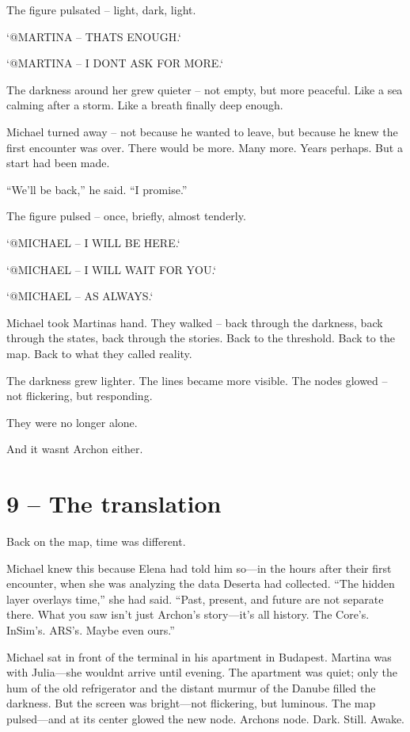 \documentclass[
]{article}
\begin{document}
The figure pulsated -- light, dark, light.

`@MARTINA -- THAT\textquotesingle S ENOUGH.`

`@MARTINA -- I DON\textquotesingle T ASK FOR MORE.`

The darkness around her grew quieter -- not empty, but more peaceful. Like a sea calming after a storm. Like a breath finally deep enough.

Michael turned away -- not because he wanted to leave, but because he knew the first encounter was over. There would be more. Many more. Years perhaps. But a start had been made.

``We'll be back,'' he said. ``I promise.''

The figure pulsed -- once, briefly, almost tenderly.

`@MICHAEL -- I WILL BE HERE.`

`@MICHAEL -- I WILL WAIT FOR YOU.`

`@MICHAEL -- AS ALWAYS.`

Michael took Martina\textquotesingle s hand. They walked -- back through the darkness, back through the states, back through the stories. Back to the threshold. Back to the map. Back to what they called reality.

The darkness grew lighter. The lines became more visible. The nodes glowed -- not flickering, but responding.

They were no longer alone.

And it wasn\textquotesingle t Archon either.

\section{9 -- The translation}\label{the-translation}

Back on the map, time was different.

Michael knew this because Elena had told him so---in the hours after their first encounter, when she was analyzing the data Deserta had collected. ``The hidden layer overlays time,'' she had said. ``Past, present, and future are not separate there. What you saw isn't just Archon's story---it's all history. The Core's. InSim's. ARS's. Maybe even ours.''

Michael sat in front of the terminal in his apartment in Budapest. Martina was with Julia---she wouldn\textquotesingle t arrive until evening. The apartment was quiet; only the hum of the old refrigerator and the distant murmur of the Danube filled the darkness. But the screen was bright---not flickering, but luminous. The map pulsed---and at its center glowed the new node. Archon\textquotesingle s node. Dark. Still. Awake.
\end{document}
